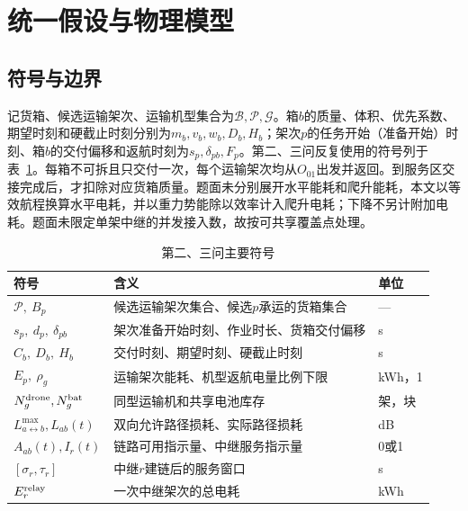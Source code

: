 \documentclass[bwprint,fontset=fandol]{gmcmthesis}
\begin{document}
\section{统一假设与物理模型}
\subsection{符号与边界}
记货箱、候选运输架次、运输机型集合为$\mathcal B,\mathcal P,\mathcal G$。箱$b$的质量、体积、优先系数、期望时刻和硬截止时刻分别为$m_b,v_b,w_b,D_b,H_b$；架次$p$的任务开始（准备开始）时刻、箱$b$的交付偏移和返航时刻为$s_p,\delta_{pb},F_p$。第二、三问反复使用的符号列于表~\ref{tab:symbols-q23}。每箱不可拆且只交付一次，每个运输架次均从$O_{01}$出发并返回。到服务区交接完成后，才扣除对应货箱质量。题面未分别展开水平能耗和爬升能耗，本文以等效航程换算水平电耗，并以重力势能除以效率计入爬升电耗；下降不另计附加电耗。题面未限定单架中继的并发接入数，故按可共享覆盖点处理。
\begin{table}[htbp]
\centering\small
\caption{第二、三问主要符号}
\label{tab:symbols-q23}
\begin{tabularx}{0.95\textwidth}{@{}lXl@{}}
\toprule
符号 & 含义 & 单位\\
\midrule
$\mathcal P,\ B_p$ & 候选运输架次集合、候选$p$承运的货箱集合 & ---\\
$s_p,\ d_p,\ \delta_{pb}$ & 架次准备开始时刻、作业时长、货箱交付偏移 & s\\
$C_b,\ D_b,\ H_b$ & 交付时刻、期望时刻、硬截止时刻 & s\\
$E_p,\ \rho_g$ & 运输架次能耗、机型返航电量比例下限 & kWh，1\\
$N_g^{\rm drone},N_g^{\rm bat}$ & 同型运输机和共享电池库存 & 架，块\\
$L^{\max}_{a\leftrightarrow b},L_{ab}(t)$ & 双向允许路径损耗、实际路径损耗 & dB\\
$A_{ab}(t), I_r(t)$ & 链路可用指示量、中继服务指示量 & 0或1\\
$[\sigma_r,\tau_r]$ & 中继$r$建链后的服务窗口 & s\\
$E_r^{\rm relay}$ & 一次中继架次的总电耗 & kWh\\
\bottomrule
\end{tabularx}
\end{table}
\end{document}
